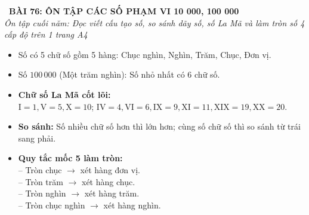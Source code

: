 \documentclass[11pt,a4paper]{article}
\begin{document}
\begin{tcolorbox}[
  enhanced,
  colback=white,
  colframe=primary,
  arc=3mm,
  boxrule=1.2pt,
  left=4mm, right=4mm, top=2.5mm, bottom=2.5mm,
  drop shadow=black!10!white
]
  \centering
  {\Large\bfseries\color{primary}\faBookmark\ BÀI 76: ÔN TẬP CÁC SỐ PHẠM VI 10 000, 100 000}\\[1.5mm]
  {\small\itshape\color{black!75}Ôn tập cuối năm: Đọc viết cấu tạo số, so sánh dãy số, số La Mã và làm tròn số 4 cấp độ trên 1 trang A4}
\end{tcolorbox}

\vspace{-2mm}


\noindent
\begin{minipage}[t]{0.49\textwidth}\vspace{0pt}
\begin{tcolorbox}[
  enhanced,
  colback=blue!4!white,
  colframe=blue!75!black,
  arc=2mm, boxrule=0.8pt,
  left=2mm, right=2mm, top=1.8mm, bottom=1.8mm,
  title={\footnotesize\bfseries\color{white}\faKey\ 1. Cấu tạo số và số La Mã}
]
{\footnotesize
\begin{itemize}\setlength{\itemsep}{1.5pt}\setlength{\leftskip}{-2.5mm}
  \item Số có 5 chữ số gồm 5 hàng: Chục nghìn, Nghìn, Trăm, Chục, Đơn vị.
  \item Số $100\,000$ (Một trăm nghìn): Số nhỏ nhất có 6 chữ số.
  \item \textbf{Chữ số La Mã cốt lõi:}\\
  $\text{I}=1, \text{V}=5, \text{X}=10$; $\text{IV}=4, \text{VI}=6, \text{IX}=9, \text{XI}=11, \text{XIX}=19, \text{XX}=20$.
\end{itemize}
}
\end{tcolorbox}
\end{minipage}
\hfill
\begin{minipage}[t]{0.49\textwidth}\vspace{0pt}
\begin{tcolorbox}[
  enhanced,
  colback=teal!4!white,
  colframe=teal!75!black,
  arc=2mm, boxrule=0.8pt,
  left=2mm, right=2mm, top=1.8mm, bottom=1.8mm,
  title={\footnotesize\bfseries\color{white}\faSliders\ 2. So sánh và Làm tròn số}
]
{\footnotesize
\begin{itemize}\setlength{\itemsep}{1.5pt}\setlength{\leftskip}{-2.5mm}
  \item \textbf{So sánh:} Số nhiều chữ số hơn thì lớn hơn; cùng số chữ số thì so sánh từ trái sang phải.
  \item \textbf{Quy tắc mốc 5 làm tròn:}\\
  -- Tròn chục $\to$ xét hàng đơn vị.\\
  -- Tròn trăm $\to$ xét hàng chục.\\
  -- Tròn nghìn $\to$ xét hàng trăm.\\
  -- Tròn chục nghìn $\to$ xét hàng nghìn.
\end{itemize}
}
\end{tcolorbox}
\end{minipage}
\end{document}
